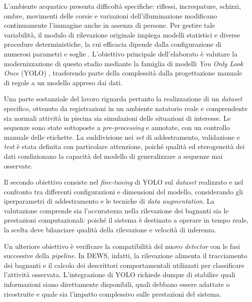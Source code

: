 L'ambiente acquatico presenta difficoltà specifiche: riflessi, increspature, schizzi, ombre, movimenti delle corsie e variazioni dell'illuminazione modificano continuamente l'immagine anche in assenza di persone. Per gestire tale variabilità, il modulo di rilevazione originale impiega modelli statistici e diverse procedure deterministiche, la cui efficacia dipende dalla configurazione di numerosi parametri e soglie \cite{Eng2004Region,Eng2006Robust,Eng2008DEWS}. L'obiettivo principale dell'elaborato è valutare la modernizzazione di questo stadio mediante la famiglia di modelli \textit{You Only Look Once} (YOLO) \cite{Redmon2016YOLO}, trasferendo parte della complessità dalla progettazione manuale di regole a un modello appreso dai dati.

Una parte sostanziale del lavoro riguarda pertanto la realizzazione di un \emph{dataset} specifico, ottenuto da registrazioni in un ambiente natatorio reale e comprendente sia normali attività in piscina sia simulazioni delle situazioni di interesse. Le sequenze sono state sottoposte a \emph{pre-processing} e annotate, con un controllo manuale delle etichette. La suddivisione nei \emph{set} di addestramento, validazione e \emph{test} è stata definita con particolare attenzione, poiché qualità ed eterogeneità dei dati condizionano la capacità del modello di generalizzare a sequenze mai osservate.

Il secondo obiettivo consiste nel \emph{fine-tuning} di YOLO sul \emph{dataset} realizzato e nel confronto tra differenti configurazioni e dimensioni del modello, considerando gli iperparametri di addestramento e le tecniche di \emph{data augmentation}. La valutazione comprende sia l'accuratezza nella rilevazione dei bagnanti sia le prestazioni computazionali: poiché il sistema è destinato a operare in tempo reale, la scelta deve bilanciare qualità della rilevazione e velocità di inferenza.

Un ulteriore obiettivo è verificare la compatibilità del nuovo \emph{detector} con le fasi successive della \emph{pipeline}. In DEWS, infatti, la rilevazione alimenta il tracciamento dei bagnanti e il calcolo dei descrittori comportamentali utilizzati per classificare l'attività osservata. L'integrazione di YOLO richiede dunque di stabilire quali informazioni siano direttamente disponibili, quali debbano essere adattate o ricostruite e quale sia l'impatto complessivo sulle prestazioni del sistema.

